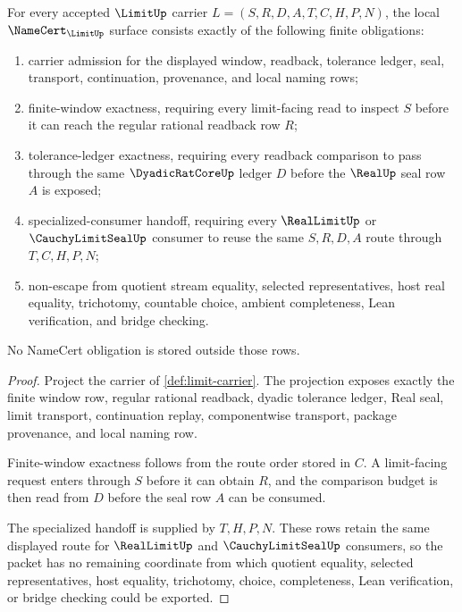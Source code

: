 \begin{theorem}
\label{thm:limit-namecert-obligations}
For every accepted $\LimitUp$ carrier $L=(S,R,D,A,T,C,H,P,N)$, the local $\NameCert_{\LimitUp}$ surface consists exactly of the following finite obligations:
\begin{enumerate}
\item carrier admission for the displayed window, readback, tolerance ledger, seal, transport, continuation, provenance, and local naming rows;
\item finite-window exactness, requiring every limit-facing read to inspect $S$ before it can reach the regular rational readback row $R$;
\item tolerance-ledger exactness, requiring every readback comparison to pass through the same $\DyadicRatCoreUp$ ledger $D$ before the $\RealUp$ seal row $A$ is exposed;
\item specialized-consumer handoff, requiring every $\RealLimitUp$ or $\CauchyLimitSealUp$ consumer to reuse the same $S,R,D,A$ route through $T,C,H,P,N$;
\item non-escape from quotient stream equality, selected representatives, host real equality, trichotomy, countable choice, ambient completeness, Lean verification, and bridge checking.
\end{enumerate}
No NameCert obligation is stored outside those rows.
\end{theorem}
\begin{proof}
Project the carrier of \autoref{def:limit-carrier}. The projection exposes exactly the finite window row, regular rational readback, dyadic tolerance ledger, Real seal, limit transport, continuation replay, componentwise transport, package provenance, and local naming row.

Finite-window exactness follows from the route order stored in $C$. A limit-facing request enters through $S$ before it can obtain $R$, and the comparison budget is then read from $D$ before the seal row $A$ can be consumed.

The specialized handoff is supplied by $T,H,P,N$. These rows retain the same displayed route for $\RealLimitUp$ and $\CauchyLimitSealUp$ consumers, so the packet has no remaining coordinate from which quotient equality, selected representatives, host equality, trichotomy, choice, completeness, Lean verification, or bridge checking could be exported.
\end{proof}

